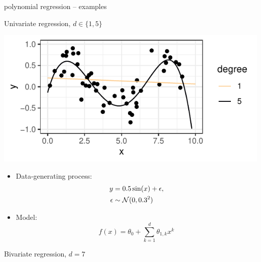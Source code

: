 \documentclass[11pt,compress,t,notes=noshow, xcolor=table]{beamer}
\begin{document}
\begin{frame}{polynomial regression -- examples}

Univariate regression, $d \in \{1, 5\}$

\begin{minipage}[c]{0.5\textwidth}
  \includegraphics[width=\textwidth]{figure/reg_poly_univ_2}
\end{minipage}
\begin{minipage}[c]{0.45\textwidth}
  \begin{itemize}
    \footnotesize
    \item
    Data-generating process:
    \begin{align*}
      y &= 0.5 \sin(x) + \epsilon, \\
      \epsilon &\sim \mathcal{N}(0, 0.3^2)
    \end{align*}
    \item Model: $$f(x) = \theta_0 + \sum_{k = 1}^d \theta_{1, k} x^k$$
  \end{itemize}
\end{minipage}

\vfill

Bivariate regression, $d = 7$


\end{frame}
\end{document}
